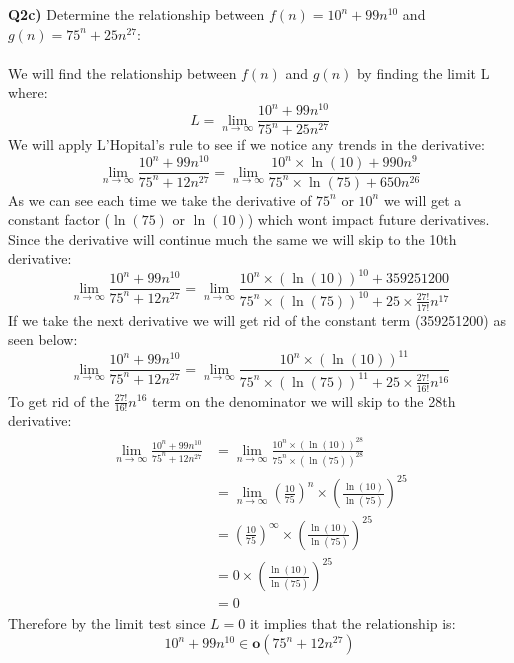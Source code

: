 \documentclass[12pt]{article}
\begin{document}
\begin{adjustwidth}{0em}{0pt}
\textbf{Q2c)} Determine the relationship between $f(n) = 10^n+99n^{10}$ and $g(n) = 75^n + 25n^{27}$:\\ \\
We will find the relationship between $f(n)$ and $g(n)$ by finding the limit L where:
\[ L =  \lim_{n\to\infty}\frac{10^n+99n^{10}}{75^n + 25n^{27}} \]
We will apply L'Hopital's rule to see if we notice any trends in the derivative:
\[ \lim_{n\to\infty}\frac{10^n+99n^{10}}{75^n + 12n^{27}} = \lim_{n\to\infty}\frac{10^n\times\ln(10)+990n^{9}}{75^n\times\ln(75) + 650n^{26}} \]
As we can see each time we take the derivative of $75^n$ or $10^n$ we will get a constant factor ($\ln(75)$ or $\ln(10)$) which wont impact future derivatives. Since the derivative will continue much the same we will skip to the 10th derivative:
\[ \lim_{n\to\infty}\frac{10^n+99n^{10}}{75^n + 12n^{27}} = \lim_{n\to\infty}\frac{10^n\times(\ln(10))^{10}+359251200}{75^n\times(\ln(75))^{10} + 25\times \frac{27!}{17!}n^{17}} \]
If we take the next derivative we will get rid of the constant term (359251200) as seen below:
\[ \lim_{n\to\infty}\frac{10^n+99n^{10}}{75^n + 12n^{27}} = \lim_{n\to\infty}\frac{10^n\times(\ln(10))^{11}}{75^n\times(\ln(75))^{11} + 25\times \frac{27!}{16!}n^{16}} \]
To get rid of the $\frac{27!}{16!}n^{16}$ term on the denominator we will skip to the 28th derivative:
\begin{align*}
    \begin{aligned}
       \lim_{n\to\infty}\frac{10^n+99n^{10}}{75^n + 12n^{27}} &= \lim_{n\to\infty}\frac{10^n\times(\ln(10))^{28}}{75^n\times(\ln(75))^{28}} \\
       &= \lim_{n\to\infty}(\frac{10}{75})^{n}\times(\frac{\ln(10)}{\ln(75)})^{25} \\
       &= (\frac{10}{75})^{\infty}\times(\frac{\ln(10)}{\ln(75)})^{25} \\
       &= 0\times(\frac{\ln(10)}{\ln(75)})^{25} \\
       &= 0
    \end{aligned}
\end{align*}
Therefore by the limit test since $L = 0$ it implies that the relationship is:
\[ 10^n+99n^{10} \in \textbf{o}(75^n + 12n^{27}) \]\\
\end{adjustwidth}
\end{document}
